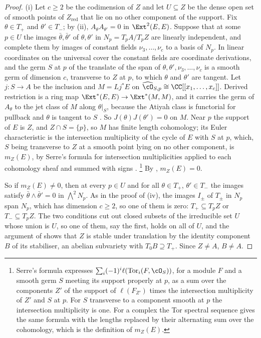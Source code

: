 \begin{proof}
(i) Let $c\ge2$ be the codimension of $Z$ and let $U\subseteq Z$ be the dense
open set of smooth points of $Z_{\mathrm{red}}$ that lie on no other component
of the support. Fix $\theta\in T_{+}$ and $\theta'\in T_{-}$; by
(ii), $A_{\theta}A_{\theta'}=0$ in $\Ext^{2}(E,E)$.
Suppose that at some $p\in U$ the images $\bar\theta,\bar\theta'$ of
$\theta,\theta'$ in $N_{p}=T_{p}A/T_{p}Z$ are linearly independent, and
complete them by images of constant fields $\nu_{3},\dots,\nu_{c}$ to a basis
of $N_{p}$. In linear coordinates on the universal cover the constant fields
are coordinate derivations, and the germ $S$ at $p$ of the translate of the
span of $\theta,\theta',\nu_{3},\dots,\nu_{c}$ is a smooth germ of dimension
$c$, transverse to $Z$ at $p$, to which $\theta$ and $\theta'$ are tangent.
Let $j\colon S\to A$ be the inclusion and $M=Lj^{*}E$ on
$\widehat{\cO}_{S,p}\cong\CC[[x_{1},\dots,x_{c}]]$. Derived restriction is a
ring map $\Ext^{*}(E,E)\to\Ext^{*}(M,M)$, and it carries the germ of
$A_{\theta}$ to the jet class of $M$ along $\theta|_{S}$, because the Atiyah
class is functorial for pullback and $\theta$ is tangent to $S$
\cite[Section 3]{BF03}. So $J(\theta)J(\theta')=0$ on $M$. Near $p$ the support
of $E$ is $Z$, and $Z\cap S=\{p\}$, so $M$ has finite length cohomology; its
Euler characteristic is the intersection multiplicity of the cycle of $E$
with $S$ at $p$, which, $S$ being transverse to $Z$ at a smooth point lying on
no other component, is $m_{Z}(E)$, by Serre's formula for intersection
multiplicities applied to each cohomology sheaf and summed with signs
\cite[Chapter~V]{Ser00}.%
\footnote{Serre's formula expresses $\sum_{i}(-1)^{i}\ell(\mathrm{Tor}_{i}(F,
\cO_{S}))$, for a module $F$ and a smooth germ $S$ meeting its support
properly at $p$, as a sum over the components $Z'$ of the support of
$\ell(F_{Z'})$ times the intersection multiplicity of $Z'$ and $S$ at $p$. For
$S$ transverse to a component smooth at $p$ the intersection multiplicity is
one. For a complex the Tor spectral sequence gives the same formula with the
lengths replaced by their alternating sum over the cohomology, which is the
definition of $m_{Z}(E)$.}
By , $m_{Z}(E)=0$.

So if $m_{Z}(E)\ne0$, then at every $p\in U$ and for all $\theta\in T_{+}$,
$\theta'\in T_{-}$ the images satisfy $\bar\theta\wedge\bar\theta'=0$ in
$\bigwedge^{2}N_{p}$. As in the proof of (iv), the images
$I_{\pm}$ of $T_{\pm}$ in $N_{p}$ span $N_{p}$, which has dimension $c\ge2$,
so one of them is zero: $T_{+}\subseteq T_{p}Z$ or $T_{-}\subseteq T_{p}Z$.
The two conditions cut out closed subsets of the irreducible set $U$ whose
union is $U$, so one of them, say the first, holds on all of $U$, and the
argument of  shows that $Z$ is stable under translation by
the identity component $B$ of its stabiliser, an abelian subvariety with
$T_{0}B\supseteq T_{+}$. Since $Z\ne A$, $B\ne A$.


\end{proof}
